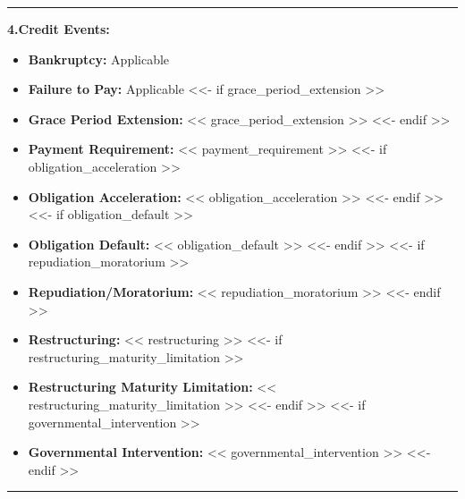 \documentclass[11pt, a4paper]{article}
\begin{document}
\vspace{0.5cm}
\hrule
\vspace{0.5cm}


\noindent \textbf{4.\quad Credit Events:}
\begin{itemize}[leftmargin=2cm, label={}, itemsep=3pt]
    \item \textbf{Bankruptcy:} Applicable
    \item \textbf{Failure to Pay:} Applicable
<<- if grace_period_extension >>
    \item \textbf{Grace Period Extension:} << grace_period_extension >>
<<- endif >>
    \item \textbf{Payment Requirement:} << payment_requirement >>
<<- if obligation_acceleration >>
    \item \textbf{Obligation Acceleration:} << obligation_acceleration >>
<<- endif >>
<<- if obligation_default >>
    \item \textbf{Obligation Default:} << obligation_default >>
<<- endif >>
<<- if repudiation_moratorium >>
    \item \textbf{Repudiation/Moratorium:} << repudiation_moratorium >>
<<- endif >>
    \item \textbf{Restructuring:} << restructuring >>
<<- if restructuring_maturity_limitation >>
    \item \textbf{Restructuring Maturity Limitation:} << restructuring_maturity_limitation >>
<<- endif >>
<<- if governmental_intervention >>
    \item \textbf{Governmental Intervention:} << governmental_intervention >>
<<- endif >>
\end{itemize}

\vspace{0.5cm}
\hrule
\vspace{0.5cm}

\end{document}
